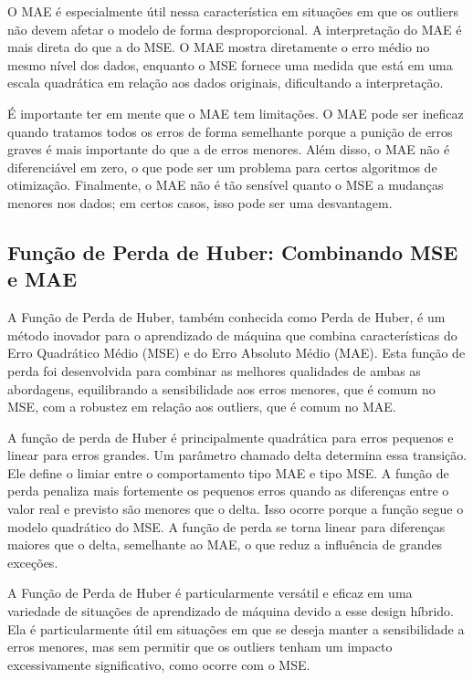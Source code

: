 \documentclass{article}
\begin{document}
O MAE é especialmente útil nessa característica em situações em que os outliers não devem afetar o modelo de forma desproporcional. A interpretação do MAE é mais direta do que a do MSE. O MAE mostra diretamente o erro médio no mesmo nível dos dados, enquanto o MSE fornece uma medida que está em uma escala quadrática em relação aos dados originais, dificultando a interpretação.

É importante ter em mente que o MAE tem limitações. O MAE pode ser ineficaz quando tratamos todos os erros de forma semelhante porque a punição de erros graves é mais importante do que a de erros menores. Além disso, o MAE não é diferenciável em zero, o que pode ser um problema para certos algoritmos de otimização. Finalmente, o MAE não é tão sensível quanto o MSE a mudanças menores nos dados; em certos casos, isso pode ser uma desvantagem.

\subsection{Função de Perda de Huber: Combinando MSE e MAE}

A Função de Perda de Huber, também conhecida como Perda de Huber, é um método inovador para o aprendizado de máquina que combina características do Erro Quadrático Médio (MSE) e do Erro Absoluto Médio (MAE). Esta função de perda foi desenvolvida para combinar as melhores qualidades de ambas as abordagens, equilibrando a sensibilidade aos erros menores, que é comum no MSE, com a robustez em relação aos outliers, que é comum no MAE.

A função de perda de Huber é principalmente quadrática para erros pequenos e linear para erros grandes. Um parâmetro chamado delta determina essa transição. Ele define o limiar entre o comportamento tipo MAE e tipo MSE. A função de perda penaliza mais fortemente os pequenos erros quando as diferenças entre o valor real e previsto são menores que o delta. Isso ocorre porque a função segue o modelo quadrático do MSE. A função de perda se torna linear para diferenças maiores que o delta, semelhante ao MAE, o que reduz a influência de grandes exceções.

A Função de Perda de Huber é particularmente versátil e eficaz em uma variedade de situações de aprendizado de máquina devido a esse design híbrido. Ela é particularmente útil em situações em que se deseja manter a sensibilidade a erros menores, mas sem permitir que os outliers tenham um impacto excessivamente significativo, como ocorre com o MSE.
\end{document}
